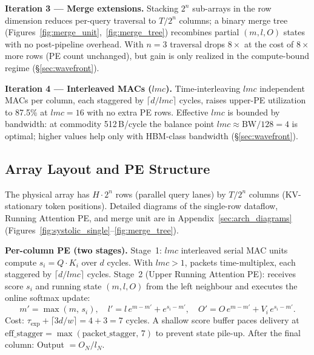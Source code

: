 \documentclass[11pt]{article}
\begin{document}
\textbf{Iteration 3 --- Merge extensions.}
Stacking $2^n$ sub-arrays in the row dimension reduces per-query traversal to
$T/2^n$ columns; a binary merge tree (Figures~\ref{fig:merge_unit},~\ref{fig:merge_tree})
recombines partial $(m,l,O)$ states with no post-pipeline overhead.
With $n{=}3$ traversal drops $8\times$ at the cost of $8\times$ more rows (PE
count unchanged), but gain is only realized in the compute-bound regime
(\S\ref{sec:wavefront}).

\textbf{Iteration 4 --- Interleaved MACs ($lmc$).}
Time-interleaving $lmc$ independent MACs per column, each staggered by
$\lceil d/lmc \rceil$ cycles, raises upper-PE utilization to 87.5\% at $lmc{=}16$
with no extra PE rows.
Effective $lmc$ is bounded by bandwidth: at commodity 512\,B/cycle the balance
point $lmc{\approx}\text{BW}/128{=}4$ is optimal; higher values help only with
HBM-class bandwidth (\S\ref{sec:wavefront}).

\subsection{Array Layout and PE Structure}
\label{sec:pe_structure}

The physical array has $H{\cdot}2^n$ rows (parallel query lanes) by
$T/2^n$ columns (KV-stationary token positions).
Detailed diagrams of the single-row dataflow, Running Attention PE, and merge
unit are in Appendix~\ref{sec:arch_diagrams}
(Figures~\ref{fig:systolic_single}--\ref{fig:merge_tree}).

\textbf{Per-column PE (two stages).}
Stage~1: $lmc$ interleaved serial MAC units compute $s_i{=}Q{\cdot}K_i$ over
$d$ cycles.
With $lmc{>}1$, packets time-multiplex, each staggered by
$\lceil d/lmc \rceil$ cycles.
Stage~2 (Upper Running Attention PE): receives score $s_i$ and running state
$(m,l,O)$ from the left neighbour and executes the online softmax update:
\[
m' = \max(m,\,s_i),\quad
l' = l\,e^{m-m'} + e^{s_i-m'},\quad
O' = O\,e^{m-m'} + V_i\,e^{s_i-m'}.
\]
Cost: $\tau_{\exp} + \lceil 3d/w \rceil = 4{+}3 = 7$ cycles.
A shallow score buffer paces delivery at
$\text{eff\_stagger} = \max(\text{packet\_stagger},\,7)$ to prevent state pile-up.
After the final column: Output $= O_N / l_N$.
\end{document}
